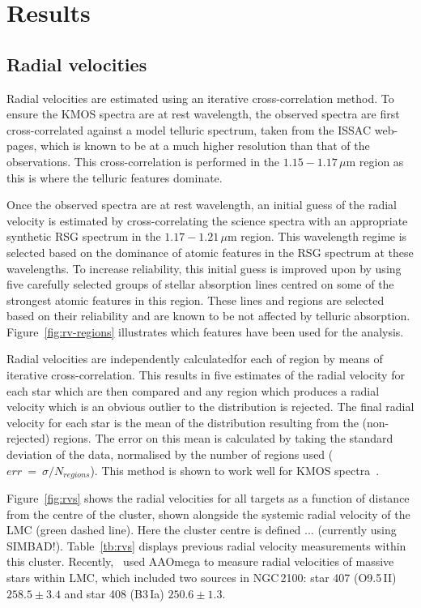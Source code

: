\documentclass[useAMS,usenatbib]{mn2e}
\begin{document}

\section{Results} %
\label{sec:results}


\subsection{Radial velocities} %
\label{sub:radial_velocities}
Radial velocities are estimated using an iterative cross-correlation method.
To ensure the KMOS spectra are at rest wavelength, the observed spectra are first cross-correlated against a model telluric spectrum, taken from the ISSAC web-pages, which is known to be at a much higher resolution than that of the observations.
This cross-correlation is performed in the $1.15-1.17\,\mu$m region as this is where the telluric features dominate.

Once the observed spectra are at rest wavelength, an initial guess of the radial velocity is estimated by cross-correlating the science spectra with an appropriate synthetic RSG spectrum in the $1.17-1.21\,\mu$m region.
This wavelength regime is selected based on the dominance of atomic features in the RSG spectrum at these wavelengths.
To increase reliability, this initial guess is improved upon by using five carefully selected groups of stellar absorption lines centred on some of the strongest atomic features in this region.
These lines and regions are selected based on their reliability and are known to be not affected by telluric absorption.
Figure~\ref{fig:rv-regions} illustrates which features have been used for the analysis.

Radial velocities are independently calculatedfor each of region by means of iterative cross-correlation.
This results in five estimates of the radial velocity for each star which are then compared and any region which produces a radial velocity which is an obvious outlier to the distribution is rejected.
The final radial velocity for each star is the mean of the distribution resulting from the (non-rejected) regions.
The error on this mean is calculated by taking the standard deviation of the data, normalised by the number of regions used ($err~=~\sigma/N_{regions}$).
This method is shown to work well for KMOS spectra~\citep{2015ApJ...798...23L,2015ApJ...803...14P}.

Figure~\ref{fig:rvs} shows the radial velocities for all targets as a function of distance from the centre of the cluster, shown alongside the systemic radial velocity of the LMC (green dashed line).
Here the cluster centre is defined ... (currently using SIMBAD!).
Table~\ref{tb:rvs} displays previous radial velocity measurements within this cluster.
Recently,~\cite{2015arXiv150803490E} used AAOmega to measure radial velocities of massive stars within LMC, which included two sources in NGC\,2100: star 407 (O9.5\,II) $258.5\pm3.4$ and star 408 (B3\,Ia) $250.6\pm1.3$.
\end{document}
